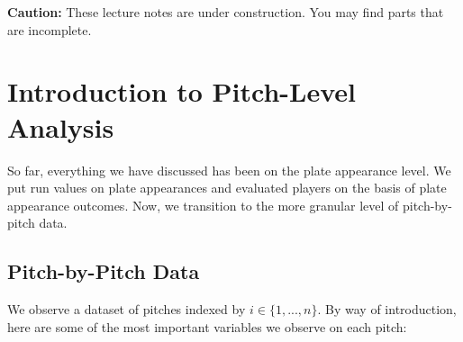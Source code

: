 \documentclass{article}
\begin{document}
\begin{framed}
  {\bf Caution:} These lecture notes are under construction. You may find parts that are incomplete.
\end{framed}

\setcounter{section}{3}
\section{\sc Introduction to Pitch-Level Analysis}

  So far, everything we have discussed has been on the plate appearance level. We put run values on plate appearances and evaluated players on the basis of plate appearance outcomes. Now, we transition to the more granular level of pitch-by-pitch data.

  \subsection{\sc Pitch-by-Pitch Data}

    We observe a dataset of pitches indexed by $i \in \{1, ..., n\}$. By way of introduction, here are some of the most important variables we observe on each pitch:
\end{document}
